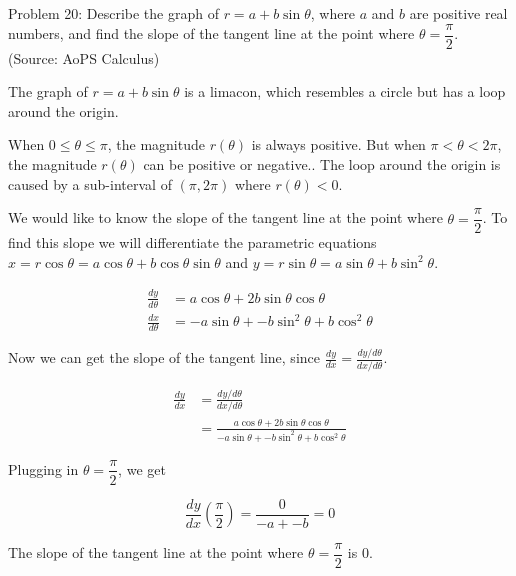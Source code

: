 Problem 20: Describe the graph of $r = a + b \sin \theta$, where $a$ and $b$ are positive real numbers, and find the slope of the tangent line at the point where $\theta = \dfrac{\pi}{2}$. (Source: AoPS Calculus)

The graph of $r = a + b \sin \theta$ is a limacon, which resembles a circle but has a loop around the origin.

When $0 \leq \theta \leq \pi$, the magnitude $r(\theta)$ is always positive. But when $\pi < \theta < 2\pi$, the magnitude $r(\theta)$ can be positive or negative.. The loop around the origin is caused by a sub-interval of $(\pi, 2\pi)$ where $r(\theta) < 0$.

We would like to know the slope of the tangent line at the point where $\theta = \dfrac{\pi}{2}$. To find this slope we will differentiate the parametric equations $x = r \cos \theta = a \cos \theta + b \cos \theta \sin \theta$ and $y = r \sin \theta = a \sin \theta + b \sin^2 \theta$.

\begin{align*}
\frac{dy}{d\theta} &= a \cos \theta + 2b \sin \theta \cos \theta \\
\frac{dx}{d\theta} &= -a \sin \theta + -b \sin^2 \theta + b \cos^2 \theta
\end{align*}

Now we can get the slope of the tangent line, since $\frac{dy}{dx} = \frac{dy/d\theta}{dx/d\theta}$.

\begin{align*}
\frac{dy}{dx} &= \frac{dy/d\theta}{dx/d\theta} \\
&= \frac{a \cos \theta + 2b \sin \theta \cos \theta}{-a \sin \theta + -b \sin^2 \theta + b \cos^2 \theta}
\end{align*}

Plugging in $\theta = \dfrac{\pi}{2}$, we get

$$ \frac{dy}{dx} \left( \frac{\pi}{2} \right) = \frac{0}{-a + -b} = \boxed{0} $$

The slope of the tangent line at the point where $\theta = \dfrac{\pi}{2}$ is $\boxed{0}$.
